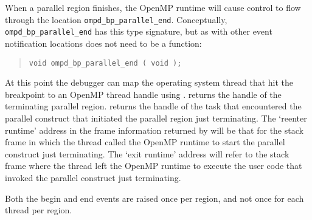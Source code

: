 When a parallel region finishes, the OpenMP runtime will cause
control to flow through
the location \texttt{ompd\_bp\_parallel\_end}.
Conceptually, \texttt{ompd\_bp\_parallel\_end} has this type
signature, but as with other event notification locations 
does not need to be a function:
\begin{quote}
\begin{lstlisting}
void ompd_bp_parallel_end ( void );
\end{lstlisting}
\end{quote}
At this point the debugger can map the operating system thread that
hit the breakpoint to an OpenMP thread handle using
.
returns the handle of the terminating parallel region.
returns the handle of the task that encountered the
parallel construct that initiated the parallel region just
terminating.
The `reenter runtime' address in the frame information returned by
will be that for the stack frame in which the thread called the
OpenMP runtime to start the parallel construct just terminating.
The `exit runtime' address will refer to the stack frame where the
thread left the OpenMP runtime to execute the user code that
invoked the parallel construct just terminating.

Both the begin and end events are raised once per region,
and not once for each thread per region.


